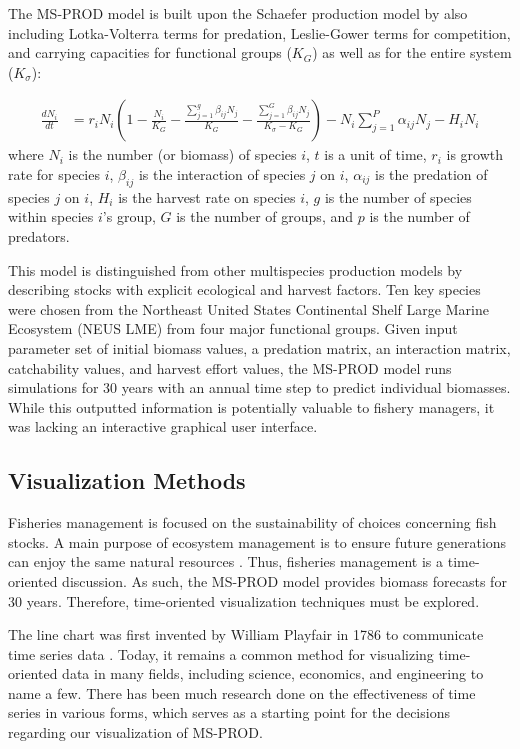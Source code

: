 \documentclass{article}
\begin{document}
The MS-PROD model is built upon the Schaefer production model by also including Lotka-Volterra terms for predation, Leslie-Gower terms for competition, and carrying capacities for functional groups ($K_G$) as well as for the entire system ($K_{\sigma}$):

\begin{align}
\frac{d N_i}{dt} &= r_i N_i \left(1 - \frac{N_i}{K_G} - \frac{\displaystyle\sum\limits_{j=1}^g \beta_{ij} N_j}{K_G} - \frac{\displaystyle\sum\limits_{j=1}^G \beta_{ij} N_j}{K_{\sigma} - K_G}\right) - N_i \displaystyle\sum\limits_{j=1}^P \alpha_{ij} N_j - H_i N_i
\end{align}
where $N_i$ is the number (or biomass) of species $i$, $t$ is a unit of time, $r_i$ is growth rate for species $i$, $\beta_{ij}$ is the interaction of species $j$ on $i$, $\alpha_{ij}$ is the predation of species $j$ on $i$, $H_i$ is the harvest rate on species $i$, $g$ is the number of species within species $i$'s group, $G$ is the number of groups, and $p$ is the number of predators.

This model is distinguished from other multispecies production models by describing stocks with explicit ecological and harvest factors.  Ten key species were chosen from the Northeast United States Continental Shelf Large Marine Ecosystem (NEUS LME) from four major functional groups.  Given input parameter set of initial biomass values, a predation matrix, an interaction matrix, catchability values, and harvest effort values, the MS-PROD model runs simulations for 30 years with an annual time step to predict individual biomasses.  While this outputted information is potentially valuable to fishery managers, it was lacking an interactive graphical user interface.  

\subsection{Visualization Methods}

Fisheries management is focused on the sustainability of choices concerning fish stocks.  A main purpose of ecosystem management is to ensure future generations can enjoy the same natural resources \cite{Christensen1996Report}.  Thus, fisheries management is a time-oriented discussion.  As such, the MS-PROD model provides biomass forecasts for 30 years.  Therefore, time-oriented visualization techniques must be explored.

The line chart was first invented by William Playfair in 1786 to communicate time series data \cite{playfair}.  Today, it remains a common method for visualizing time-oriented data in many fields, including science, economics, and engineering to name a few.  There has been much research done on the effectiveness of time series in various forms, which serves as a starting point for the decisions regarding our visualization of MS-PROD.
\end{document}
